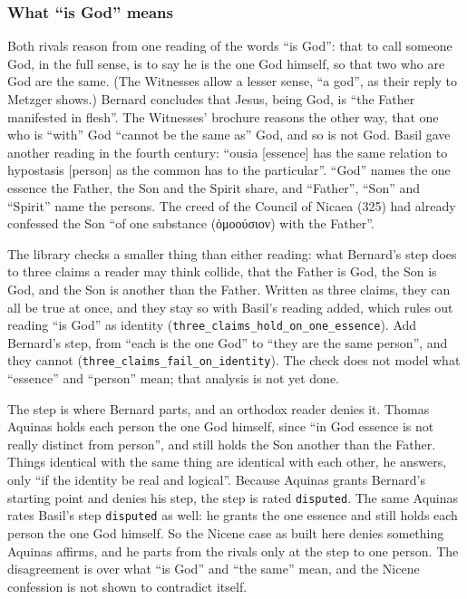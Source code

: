 \documentclass[11pt,paper=\testimonypaper,DIV=13,parskip=false]{scrartcl}
\begin{document}
\subsubsection*{What “is God” means}
Both rivals reason from one reading of the words “is God”: that to call someone God, in the full sense, is to say he is the one God himself, so that two who are God are the same. (The Witnesses allow a lesser sense, “a god”, as their reply to Metzger shows.) Bernard concludes that Jesus, being God, is “the Father manifested in flesh”. The Witnesses’ brochure reasons the other way, that one who is “with” God “cannot be the same as” God, and so is not God. Basil gave another reading in the fourth century: “ousia [essence] has the same relation to hypostasis [person] as the common has to the particular”. “God” names the one essence the Father, the Son and the Spirit share, and “Father”, “Son” and “Spirit” name the persons. The creed of the Council of Nicaea (325) had already confessed the Son “of one substance (ὁμοούσιον) with the Father”.

The library checks a smaller thing than either reading: what Bernard’s step does to three claims a reader may think collide, that the Father is God, the Son is God, and the Son is another than the Father. Written as three claims, they can all be true at once, and they stay so with Basil’s reading added, which rules out reading “is God” as identity (\texttt{three\_\allowbreak{}claims\_\allowbreak{}hold\_\allowbreak{}on\_\allowbreak{}one\_\allowbreak{}essence}). Add Bernard’s step, from “each is the one God” to “they are the same person”, and they cannot (\texttt{three\_\allowbreak{}claims\_\allowbreak{}fail\_\allowbreak{}on\_\allowbreak{}identity}). The check does not model what “essence” and “person” mean; that analysis is not yet done.

The step is where Bernard parts, and an orthodox reader denies it. Thomas Aquinas holds each person the one God himself, since “in God essence is not really distinct from person”, and still holds the Son another than the Father. Things identical with the same thing are identical with each other, he answers, only “if the identity be real and logical”. Because Aquinas grants Bernard’s starting point and denies his step, the step is rated \texttt{disputed}. The same Aquinas rates Basil’s step \texttt{disputed} as well: he grants the one essence and still holds each person the one God himself. So the Nicene case as built here denies something Aquinas affirms, and he parts from the rivals only at the step to one person. The disagreement is over what “is God” and “the same” mean, and the Nicene confession is not shown to contradict itself.
\end{document}
